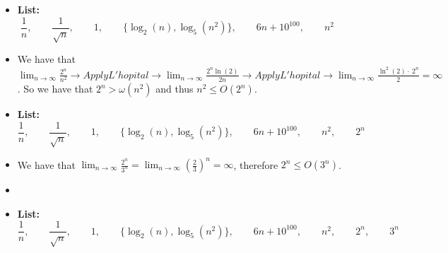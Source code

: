 \documentclass[9pt]{article}
\begin{document}
\begin{itemize}
	\item \textbf{List:} $$
	\frac{1}{n}, \qquad
	\frac{1}{\sqrt{n}}, \qquad
	1, \qquad 
	\{\log_2(n),
	\log_5(n^2)\}, \qquad
	6n+10^{100}, \qquad
	n^2 \qquad
	$$
	\item We have that $\lim_{n \to \infty} \frac{2^n}{n^2} \rightarrow Apply L'hopital \rightarrow \lim_{n \to \infty} \frac{2^n\ln \left(2\right)}{2n} \rightarrow Apply L'hopital \rightarrow \lim_{n \to \infty} \frac{\ln ^2\left(2\right)\cdot \:2^n}{2} = \infty$. So we have that $2^n > \omega (n^2)$ and thus $n^2 \le O(2^n)$.
	\item \textbf{List:} $$
	\frac{1}{n}, \qquad
	\frac{1}{\sqrt{n}}, \qquad
	1, \qquad 
	\{\log_2(n),
	\log_5(n^2)\}, \qquad
	6n+10^{100}, \qquad
	n^2, \qquad
	2^n \qquad
	$$
	\item We have that $\lim_{n \to \infty} \frac{2^n}{3^n} = \lim_{n \to \infty} \left(\frac{2}{3}\right)^n = \infty$, therefore $2^n \le O(3^n)$.
	\item \item \textbf{List:} $$
	\frac{1}{n}, \qquad
	\frac{1}{\sqrt{n}}, \qquad
	1, \qquad 
	\{\log_2(n),
	\log_5(n^2)\}, \qquad
	6n+10^{100}, \qquad
	n^2, \qquad
	2^n, \qquad
	3^n
	$$
\end{itemize}

\fi
\newpage



\vspace{5mm}
\end{document}
